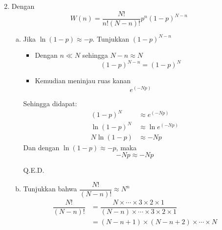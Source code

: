 \begin{enumerate}
\begin{enumerate}[(a)]
\begin{equation*}
        \end{equation*}
    \end{enumerate}
    \item Dengan
    \begin{equation*}
        W(n)=\dfrac{N!}{n!(N-n)!}p^n(1-p)^{N-n}
    \end{equation*}
    \begin{enumerate}[(a)]
        \item Jika $\ln(1-p)\approx-p$. Tunjukkan $(1-p)^{N-n}$\\
        \begin{itemize}
            \item Dengan $n\ll N$ sehingga $N-n\approx N$
            \begin{equation*}
                (1-p)^{N-n}=(1-p)^N
            \end{equation*}
            \item Kemudian meninjau ruas kanan
            \begin{equation*}
                e^{(-Np)}
            \end{equation*}
        \end{itemize}
        Sehingga didapat:
        \begin{equation*}
        	\begin{split}
            (1-p)^N &\approx e^{(-Np)}\\
            \ln(1-p)^N &\approx \ln e^{(-Np)}\\
            N\ln(1-p) &\approx-Np
        	\end{split}
        \end{equation*}
        Dan dengan $\ln(1-p)\approx -p$, maka
        \begin{equation*}
            -Np\approx-Np
        \end{equation*}
        \begin{center}
            Q.E.D.
        \end{center}
        \item Tunjukkan bahwa $\dfrac{N!}{(N-n)!}\approx N^n$
        \begin{equation*}
            \begin{split}
                \dfrac{N!}{(N-n)!}&=\dfrac{N\times\cdots\times 3\times 2\times 1}{(N-n)\times\cdots\times 3\times2 \times 1}\\
                &=(N-n+1)\times (N-n+2)\times\cdots\times N
            \end{split}
        \end{equation*}

\end{enumerate}
\end{enumerate}
